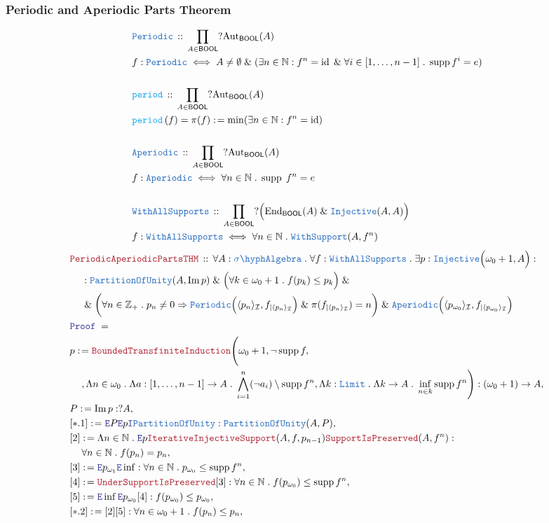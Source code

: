 \documentclass[12pt]{scrartcl}
\newcommand{\TYPE}[1]{\textcolor{NavyBlue}{\mathtt{#1}}}
\newcommand{\FUNC}[1]{\textcolor{Cerulean}{\mathtt{#1}}}
\newcommand{\LOGIC}[1]{\textcolor{Blue}{\mathtt{#1}}}
\newcommand{\THM}[1]{\textcolor{Maroon}{\mathtt{#1}}}
\renewcommand{\.}{\; . \;}
\newcommand{\de}{: \kern 0.1pc =}
\newcommand{\Act}[1]{\left( #1 \right)}
\newcommand{\Theorem}[2]{& \THM{#1} \, :: \, #2 \\ & \Proof = \\ }
\newcommand{\DeclareType}[2]{& \TYPE{#1} \, :: \, #2 \\}
\newcommand{\DefineType}[3]{& #1 : \TYPE{#2} \iff #3 \\}
\newcommand{\DeclareFunc}[2]{& \FUNC{#1} \, :: \, #2 \\}
\newcommand{\DefineNamedFunc}[4]{&  \FUNC{#1}\Act{#2} = #3 \de #4 \\}
\newcommand{\NewLine}{\\ & \kern 1pc}
\newcommand{\Page}[1]{ \begin{align*} #1 \end{align*}   }
\renewcommand{\And}{\; \& \;}
\newcommand{\Imply}{\Rightarrow}
\newcommand{\Intro}{\LOGIC{I}}
\newcommand{\Elim}{\LOGIC{E}}
\newcommand{\Int}{\mathbb{Z} }
\newcommand{\Nat}{\mathbb{N} }
\DeclareMathOperator*{\id}{id}
\DeclareMathOperator*{\im}{Im}
\DeclareMathOperator*{\supp}{supp}
\newcommand{\End}{\mathrm{End}}
\newcommand{\Aut}{\mathrm{Aut}}
\newcommand{\Inj}{\TYPE{Injective}}
\newcommand{\Say}[3]{& #1 \de #2 : #3, \\}
\newcommand{\Proof}{\LOGIC{Proof} \; }
\newcommand{\SA}{\TYPE{\sigma \hyph Algebra}}
\newcommand{\I}{\mathcal{I}}
\newcommand{\PoU}{\TYPE{PartitionOfUnity}}
\newcommand{\BOOL}{\mathsf{BOOL}}
\begin{document}
\subsubsection{Periodic and Aperiodic Parts Theorem}
\Page{
	\DeclareType{Periodic}{\prod_{A \in \BOOL} ?\Aut_\BOOL(A)}
	\DefineType{f}{Periodic}
	{
		A \neq \emptyset \And (
		\exists n \in \Nat :  f^n = \id 
		\And 
		\forall i \in [1,\ldots,n-1] \.		
		\supp f^i = e 	)
	}
	\\
	\DeclareFunc{period}{\prod_{A \in \BOOL} ?\Aut_\BOOL(A)}
	\DefineNamedFunc{period}{f}{\pi(f)}
	{
		\min (\exists n \in \Nat :  f^n = \id) 	
	}
	\\
	\DeclareType{Aperiodic}{\prod_{A \in \BOOL} ?\Aut_\BOOL(A)}
	\DefineType{f}{Aperiodic}
	{
		\forall n \in \Nat \. \supp \; f^n = e 	
	}
	\\
	\DeclareType{WithAllSupports}
	{
		\prod_{A \in \BOOL} ?\Big( \End_\BOOL(A) \And \TYPE{Injective}(A,A) \Big)
	}
	\DefineType{f}{WithAllSupports}
	{
		\forall n \in \Nat \.  \TYPE{WithSupport}(A,f^n)
	}
}\Page{
	\Theorem{PeriodicAperiodicPartsTHM}
	{
		\forall A : \SA \.
		\forall f : \TYPE{WithAllSupports} \.
		\exists p : \Inj\Big( \omega_0 + 1, A  \Big) :
		\NewLine :
		\PoU(A,\im p) 
		\And
		\Big(
			\forall k \in \omega_0 + 1 \.
			f(p_k) \le p_k
		\Big)
		\And
		\NewLine
		\And
		\bigg(
			\forall n \in \Int_+ \. 
			p_n \neq 0 \Imply
			\TYPE{Periodic}\Big(
				\langle p_n \rangle_\I, 
				f_{|\langle p_n \rangle_\I} 
			\Big)
			\And
			\pi(f_{|\langle p_n \rangle_\I}) = n
		\bigg)
		\And
		\TYPE{Aperiodic}
		\Big(
			\langle p_{\omega_0} \rangle_\I, 
			f_{|\langle p_{\omega_0} \rangle_\I} 
		\Big)
	}
	\Say{p}
	{
		\THM{BoundedTransfiniteInduction}
		\Bigg(
			\omega_0 + 1,
			\neg \supp f, \NewLine ,
			\Lambda n \in \omega_0 \. \Lambda a :[1,\ldots,n-1] \to A \.
				\bigwedge^n_{i=1} (\neg a_i) \setminus \supp f^n,
			\Lambda k  : \TYPE{Limit} \. \Lambda k \to A \.
			\inf_{n \in k} \supp f^n
		\Bigg)
	}
	{
		(\omega_0 + 1) \to A
	}
	\Say{P}{\im p}{?A}
	\Say{[*.1]}{ \Elim P \Elim p \Intro \PoU}{\PoU(A,P)}
	\Say{[2]}
	{
		\Lambda n \in \Nat \.		
		\Elim p \THM{IterativeInjectiveSupport}(A,f,p_{n-1})
		\THM{SupportIsPreserved}(A,f^n)
	}
	{
		\NewLine		
		\forall n \in \Nat \.  f(p_n) = p_n
	}
	\Say{[3]}{ \Elim p_{\omega_1} \Elim \inf}
	{
		\forall n \in \Nat \. p_{\omega_0} \le \supp f^n 
	}
	\Say{[4]}{\THM{UnderSupportIsPreserved}[3]}
	{
		\forall n \in \Nat \. f(p_{\omega_0}) \le \supp f^n
	}
	\Say{[5]}{\Elim \inf \Elim p_{\omega_0} [4] }
	{
			f(p_{\omega_0}) \le p_{\omega_0}
	}
	\Say{[*.2]}{[2][5]}
	{
		\forall n \in \omega_0 + 1 \. f(p_n) \le p_n 
}}
\end{document}
